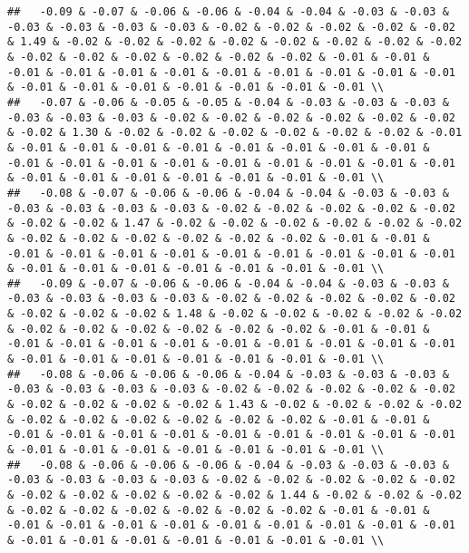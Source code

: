 \documentclass[
]{article}
\begin{document}
\begin{verbatim}
##   -0.09 & -0.07 & -0.06 & -0.06 & -0.04 & -0.04 & -0.03 & -0.03 & -0.03 & -0.03 & -0.03 & -0.03 & -0.02 & -0.02 & -0.02 & -0.02 & -0.02 & 1.49 & -0.02 & -0.02 & -0.02 & -0.02 & -0.02 & -0.02 & -0.02 & -0.02 & -0.02 & -0.02 & -0.02 & -0.02 & -0.02 & -0.02 & -0.01 & -0.01 & -0.01 & -0.01 & -0.01 & -0.01 & -0.01 & -0.01 & -0.01 & -0.01 & -0.01 & -0.01 & -0.01 & -0.01 & -0.01 & -0.01 & -0.01 & -0.01 \\ 
##   -0.07 & -0.06 & -0.05 & -0.05 & -0.04 & -0.03 & -0.03 & -0.03 & -0.03 & -0.03 & -0.03 & -0.02 & -0.02 & -0.02 & -0.02 & -0.02 & -0.02 & -0.02 & 1.30 & -0.02 & -0.02 & -0.02 & -0.02 & -0.02 & -0.02 & -0.01 & -0.01 & -0.01 & -0.01 & -0.01 & -0.01 & -0.01 & -0.01 & -0.01 & -0.01 & -0.01 & -0.01 & -0.01 & -0.01 & -0.01 & -0.01 & -0.01 & -0.01 & -0.01 & -0.01 & -0.01 & -0.01 & -0.01 & -0.01 & -0.01 \\ 
##   -0.08 & -0.07 & -0.06 & -0.06 & -0.04 & -0.04 & -0.03 & -0.03 & -0.03 & -0.03 & -0.03 & -0.03 & -0.02 & -0.02 & -0.02 & -0.02 & -0.02 & -0.02 & -0.02 & 1.47 & -0.02 & -0.02 & -0.02 & -0.02 & -0.02 & -0.02 & -0.02 & -0.02 & -0.02 & -0.02 & -0.02 & -0.02 & -0.01 & -0.01 & -0.01 & -0.01 & -0.01 & -0.01 & -0.01 & -0.01 & -0.01 & -0.01 & -0.01 & -0.01 & -0.01 & -0.01 & -0.01 & -0.01 & -0.01 & -0.01 \\ 
##   -0.09 & -0.07 & -0.06 & -0.06 & -0.04 & -0.04 & -0.03 & -0.03 & -0.03 & -0.03 & -0.03 & -0.03 & -0.02 & -0.02 & -0.02 & -0.02 & -0.02 & -0.02 & -0.02 & -0.02 & 1.48 & -0.02 & -0.02 & -0.02 & -0.02 & -0.02 & -0.02 & -0.02 & -0.02 & -0.02 & -0.02 & -0.02 & -0.01 & -0.01 & -0.01 & -0.01 & -0.01 & -0.01 & -0.01 & -0.01 & -0.01 & -0.01 & -0.01 & -0.01 & -0.01 & -0.01 & -0.01 & -0.01 & -0.01 & -0.01 \\ 
##   -0.08 & -0.06 & -0.06 & -0.06 & -0.04 & -0.03 & -0.03 & -0.03 & -0.03 & -0.03 & -0.03 & -0.03 & -0.02 & -0.02 & -0.02 & -0.02 & -0.02 & -0.02 & -0.02 & -0.02 & -0.02 & 1.43 & -0.02 & -0.02 & -0.02 & -0.02 & -0.02 & -0.02 & -0.02 & -0.02 & -0.02 & -0.02 & -0.01 & -0.01 & -0.01 & -0.01 & -0.01 & -0.01 & -0.01 & -0.01 & -0.01 & -0.01 & -0.01 & -0.01 & -0.01 & -0.01 & -0.01 & -0.01 & -0.01 & -0.01 \\ 
##   -0.08 & -0.06 & -0.06 & -0.06 & -0.04 & -0.03 & -0.03 & -0.03 & -0.03 & -0.03 & -0.03 & -0.03 & -0.02 & -0.02 & -0.02 & -0.02 & -0.02 & -0.02 & -0.02 & -0.02 & -0.02 & -0.02 & 1.44 & -0.02 & -0.02 & -0.02 & -0.02 & -0.02 & -0.02 & -0.02 & -0.02 & -0.02 & -0.01 & -0.01 & -0.01 & -0.01 & -0.01 & -0.01 & -0.01 & -0.01 & -0.01 & -0.01 & -0.01 & -0.01 & -0.01 & -0.01 & -0.01 & -0.01 & -0.01 & -0.01 \\ 

\end{verbatim}
\end{document}
